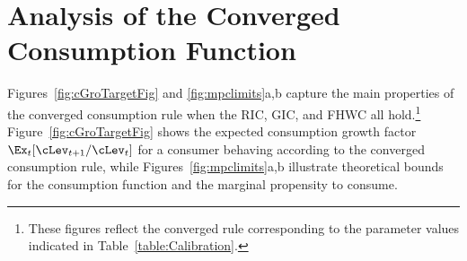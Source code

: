 \documentclass[titlepage]{\econtex}\providecommand{\texname}{BufferStockTheory}%
\begin{document}
{\begin{comment}
The precautionary motive induced by the noncapital income risk can be
thought of as being like a smoothed version of liquidity constraints.
As cash declines toward zero, the size of the risk relative to the
size of cash increases, which means that the relative variation in
consumption increases, which means that the intensity of the
precautionary motive increases.  For a more rigorous and detailed
treatment of the relationship between precautionary saving and
liquidity constraints, see Carroll and
Kimball~\citeyearpar{carroll&kimball:liquidity}.
\end{comment}

\section{Analysis of the Converged Consumption Function}

Figures~\ref{fig:cGroTargetFig} and \ref{fig:mpclimits}a,b capture the
main properties of the converged consumption rule when the RIC, GIC,
and FHWC all hold.\footnote{These figures reflect the converged rule
  corresponding to the parameter values indicated in
  Table~\ref{table:Calibration}.}  Figure~\ref{fig:cGroTargetFig}
shows the expected consumption growth factor
$\Ex_{t}[\cLev_{t+1}/\cLev_{t}]$ for a consumer behaving according to
the converged consumption rule, while Figures~\ref{fig:mpclimits}a,b
illustrate theoretical bounds for the consumption function and the
marginal propensity to consume.

}
\end{document}
